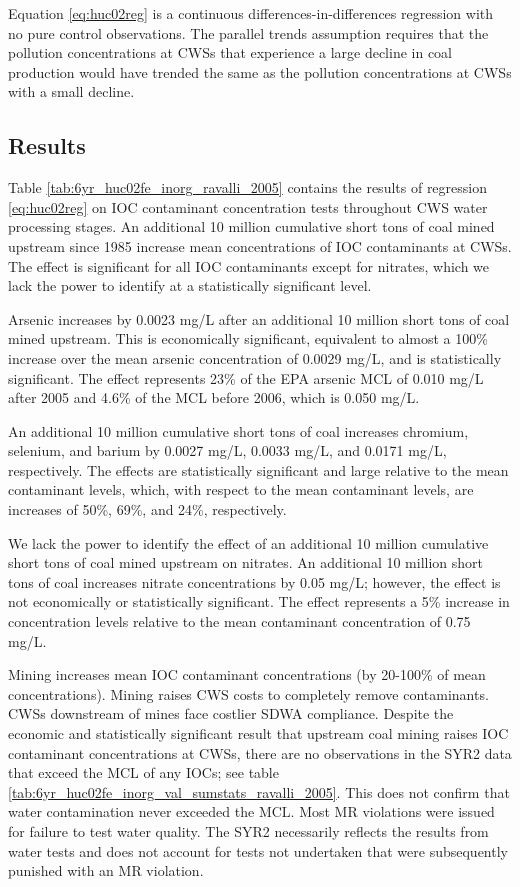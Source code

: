 \documentclass{article}
\begin{document}
Equation \ref{eq:huc02reg} is a continuous differences-in-differences regression with no pure control observations. The parallel trends assumption requires that the pollution concentrations at CWSs that experience a large decline in coal production would have trended the same as the pollution concentrations at CWSs with a small decline.

\subsection{Results}



Table \ref{tab:6yr_huc02fe_inorg_ravalli_2005} contains the results of regression \ref{eq:huc02reg} on IOC contaminant concentration tests throughout CWS water processing stages. An additional 10 million cumulative short tons of coal mined upstream since 1985 increase mean concentrations of IOC contaminants at CWSs. The effect is significant for all IOC contaminants except for nitrates, which we lack the power to identify at a statistically significant level.

Arsenic increases by 0.0023 mg/L after an additional 10 million short tons of coal mined upstream. This is economically significant, equivalent to almost a 100\% increase over the mean arsenic concentration of 0.0029 mg/L, and is statistically significant. The effect represents 23\% of the EPA arsenic MCL of 0.010 mg/L after 2005 and 4.6\% of the MCL before 2006, which is 0.050 mg/L.

An additional 10 million cumulative short tons of coal increases chromium, selenium, and barium by 0.0027 mg/L, 0.0033 mg/L, and 0.0171 mg/L, respectively. The effects are statistically significant and large relative to the mean contaminant levels, which, with respect to the mean contaminant levels, are increases of 50\%, 69\%, and 24\%, respectively.

We lack the power to identify the effect of an additional 10 million cumulative short tons of coal mined upstream on nitrates. An additional 10 million short tons of coal increases nitrate concentrations by 0.05 mg/L; however, the effect is not economically or statistically significant. The effect represents a 5\% increase in concentration levels relative to the mean contaminant concentration of 0.75 mg/L.

Mining increases mean IOC contaminant concentrations (by 20-100\%
of mean concentrations). Mining raises CWS costs to completely remove contaminants. CWSs downstream of mines face costlier SDWA compliance. Despite the economic and statistically significant result that upstream coal mining raises IOC contaminant concentrations at CWSs, there are no observations in the SYR2 data that exceed the MCL of any IOCs; see table \ref{tab:6yr_huc02fe_inorg_val_sumstats_ravalli_2005}. This does not confirm that water contamination never exceeded the MCL. Most MR violations were issued for failure to test water quality. The SYR2 necessarily reflects the results from water tests and does not account for tests not undertaken that were subsequently punished with an MR violation.
\end{document}
